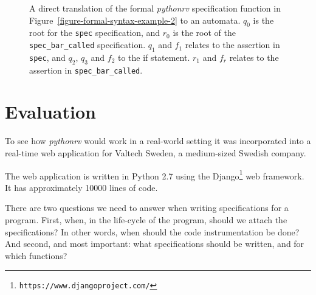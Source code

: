 \documentclass[a4paper,11pt]{kth-mag}
\begin{document}
\begin{figure}[h!]
\begin{minipage}{0.9\textwidth}
	\end{minipage}
  \caption{A direct translation of the formal \textit{pythonrv} specification
    function in Figure~\ref{figure-formal-syntax-example-2} to an automata.
    $q_0$ is the root for the \texttt{spec} specification, and $r_0$ is the
    root of the \texttt{spec\_bar\_called} specification. $q_1$ and $f_1$
    relates to the assertion in \texttt{spec}, and $q_2$, $q_3$ and $f_2$ to
    the if statement. $r_1$ and $f_r$ relates to the assertion in
    \texttt{spec\_bar\_called}.}
	\label{figure-formal-syntax-example-2-automata}
\end{figure}



\pagestyle{newchap}
\chapter{Evaluation} \label{chapter-evaluation}

To see how \textit{pythonrv} would work in a real-world setting it was
incorporated into a real-time web application for Valtech Sweden, a
medium-sized Swedish company.

The web application is written in Python 2.7 using the
Django\footnote{\texttt{https://www.djangoproject.com/}} web framework. It has
approximately 10000 lines of code.

There are two questions we need to answer when writing specifications for a
program. First, when, in the life-cycle of the program, should we attach the
specifications? In other words, when should the code instrumentation be done?
And second, and most important: what specifications should be written, and for
which functions?
\end{document}
